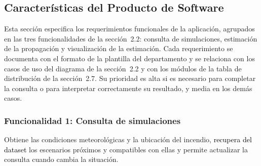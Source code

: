 \subsection{Características del Producto de Software}
\providecommand{\rqA}{\dimexpr 0.22\linewidth-2\tabcolsep-1.25\arrayrulewidth\relax}
\providecommand{\rqB}{\dimexpr 0.22\linewidth-2\tabcolsep-1.25\arrayrulewidth\relax}
\providecommand{\rqC}{\dimexpr 0.22\linewidth-2\tabcolsep-1.25\arrayrulewidth\relax}
\providecommand{\rqD}{\dimexpr 0.34\linewidth-2\tabcolsep-1.25\arrayrulewidth\relax}
\providecommand{\rqBCD}{\dimexpr 0.78\linewidth-2\tabcolsep-1.75\arrayrulewidth\relax}

Esta sección especifica los requerimientos funcionales de la aplicación, agrupados en las tres funcionalidades de la sección~2.2: consulta de simulaciones, estimación de la propagación y visualización de la estimación. Cada requerimiento se documenta con el formato de la plantilla del departamento y se relaciona con los casos de uso del diagrama de la sección~2.2 y con los módulos de la tabla de distribución de la sección~2.7. Su prioridad es alta si es necesario para completar la consulta o para interpretar correctamente su resultado, y media en los demás casos.

\subsubsection{Funcionalidad 1: Consulta de simulaciones}

Obtiene las condiciones meteorológicas y la ubicación del incendio, \textcolor{black}{recupera del dataset} los escenarios próximos y compatibles con ellas y permite actualizar la consulta cuando cambia la situación.

